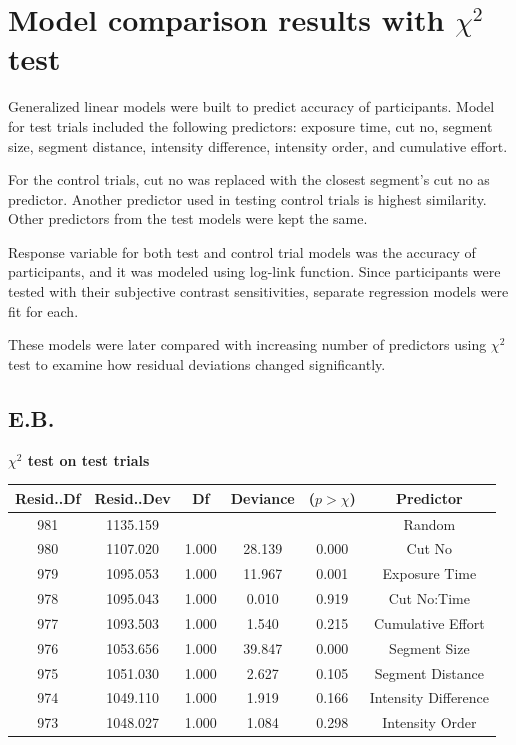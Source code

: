 \documentclass{article}
\begin{document}
\section{Model comparison results with $\chi^2$ test } \label{participantANOVAs}

Generalized linear models were built to predict accuracy of participants. Model for test trials included the following predictors: exposure time, cut no, segment size, segment distance, intensity difference, intensity order, and cumulative effort. 

For the control trials, cut no was replaced with the closest segment's cut no as predictor. Another predictor used in testing control trials is highest similarity. Other predictors from the test models were kept the same.

Response variable for both test and control trial models was the accuracy of participants, and it was modeled using log-link function. Since participants were tested with their subjective contrast sensitivities, separate regression models were fit for each. 

These models were later compared with increasing number of predictors using $\chi^2$ test to examine how residual deviations changed significantly.

\clearpage

\subsection*{E.B.}
\label{table:participantsAnovaEBTest}    
\textbf{$\chi^2$ test on test trials}
\begin{table}[ht]
    \centering    
    \begin{tabular}{cccccc}
    \hline
    Resid..Df & Resid..Dev &    Df & Deviance & ($p > \chi$) &    Predictor \\
    \hline
          981 &   1135.159 &       &          &            &       Random \\
          980 &   1107.020 & 1.000 &   28.139 &      0.000 &       Cut No \\
          979 &   1095.053 & 1.000 &   11.967 &      0.001 &    Exposure Time \\
          978 &   1095.043 & 1.000 &    0.010 &      0.919 &  Cut No:Time \\
          977 &   1093.503 & 1.000 &    1.540 &      0.215 & Cumulative Effort \\
          976 &   1053.656 & 1.000 &   39.847 &      0.000 &    Segment Size \\
          975 &   1051.030 & 1.000 &    2.627 &      0.105 &    Segment Distance \\
          974 &   1049.110 & 1.000 &    1.919 &      0.166 &   Intensity Difference \\
          973 &   1048.027 & 1.000 &    1.084 &      0.298 &     Intensity Order \\
    \hline
    \end{tabular}    
\end{table}
\end{document}
